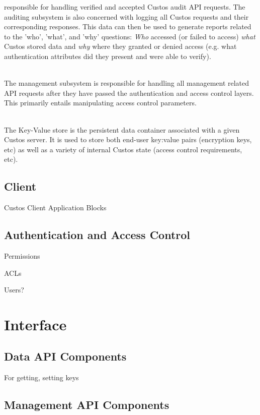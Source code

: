 \begin{packed_desc}
  responsible for handling verified and accepted Custos audit API
  requests. The auditing subsystem is also concerned with logging all
  Custos requests and their corresponding responses. This data can
  then be used to generate reports related to the 'who', 'what', and
  'why' questions: \emph{Who} accessed (or failed to access)
  \emph{what} Custos stored data and \emph{why} where they granted or
  denied access (e.g. what authentication attributes did they present
  and were able to verify).
\item[Management Subsystem] \hfill \\ The management subsystem is
  responsible for handling all management related API requests after
  they have passed the authentication and access control layers. This
  primarily entails manipulating access control parameters.
\item[Key-Value Store] \hfill \\ The Key-Value store is the persistent
  data container associated with a given Custos server. It is used to
  store both end-user key:value pairs (encryption keys, etc) as well
  as a variety of internal Custos state (access control requirements,
  etc).
\end{packed_desc}

\subsection{Client}

Custos Client Application Blocks

\subsection{Authentication and Access Control}

Permissions

ACLs

Users?

\section{Interface}

\subsection{Data API Components}

For getting, setting keys

\subsection{Management API Components}

